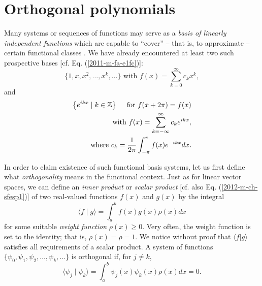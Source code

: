\section{Orthogonal polynomials}
\label{2012-m-sf-fs}

Many systems or sequences of functions may serve as a {\em basis of linearly independent functions}
which are capable to ``cover'' -- that is, to approximate -- certain functional classes
\cite{herman-sc,Marcellan}.
We have already encountered at least two such prospective bases [cf. Eq. (\ref{2011-m-fa-e1fc})]:
\begin{equation}
\{1,x,x^2,\ldots ,x^k,\ldots \} \textrm { with } f(x) =\sum_{k=0}^\infty c_k x^k,
\label{2011-m-ch-sfe1}
\end{equation}
and
\begin{equation}
\begin{split}
\left\{e^{ikx} \mid k\in {\Bbb Z} \right\} \quad \textrm{ for } f(x+2\pi)=f(x) \\
\qquad \textrm {  with }
f(x)= \sum _{k=-\infty}^\infty c_k e^{ikx},\\
\qquad  \textrm{  where }
c_k=\frac{1}{2\pi}\int_{-\pi}^\pi f(x) e^{-ikx} dx.
\end{split}
\end{equation}

In order to claim existence of such functional basis systems, let us first define what  {\em orthogonality} means in the  functional context.
Just as for linear vector spaces, we can define an
{\em inner product}
or {\em scalar product}
[cf. also Eq. (\ref{2012-m-ch-sfesp1})]
of two real-valued functions $f(x)$ and $g(x)$ by the integral \cite{Wilf}
\begin{equation}
\langle   f \mid g\rangle
=
\int_a^b f(x)g(x) \rho(x) dx
\label{2011-m-ch-sfesp}
\end{equation}
for some suitable {\em weight function} $\rho (x)\ge 0$.  
Very often, the weight function is set to the identity; that is,
$\rho(x) =\rho =1$.
We notice without proof that $\langle   f \vert g\rangle  $ satisfies all requirements of a scalar product.
A system of functions $\{\psi_0,\psi_1,\psi_2,\ldots ,\psi_k,\ldots \}$
is orthogonal if, for $j\neq k$,
\begin{equation}
\langle   \psi_j \mid \psi_k\rangle
=
\int_a^b \psi_j(x)\psi_k(x) \rho(x) dx
=0.
\label{2011-m-ch-sfespof}
\end{equation}



